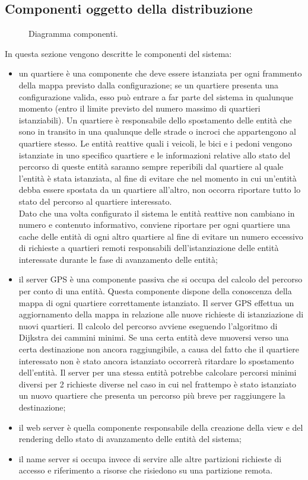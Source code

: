 \subsection{Componenti oggetto della distribuzione}\label{subsec:distribuzione}
\begin{figure}[H] %
\caption{Diagramma componenti.}
\label{fig:Diagramma componenti}
\end{figure}
In questa sezione vengono descritte le componenti del sistema:
\begin{itemize}
\item un quartiere è una componente che deve essere istanziata per ogni
frammento della mappa previsto dalla configurazione; se un quartiere presenta una configurazione valida, esso può entrare a far parte del sistema in qualunque momento (entro il limite previsto del numero massimo di quartieri istanziabili). Un quartiere è responsabile dello spostamento delle entità che sono in transito in una qualunque delle strade o incroci che appartengono al quartiere stesso. Le entità reattive quali i veicoli, le bici e i pedoni vengono istanziate in uno specifico quartiere e le informazioni relative allo stato del percorso di queste entità saranno sempre reperibili dal quartiere al quale l'entità è stata istanziata, al fine di evitare che nel momento in cui un'entità debba essere spostata da un quartiere all'altro, non occorra riportare tutto lo stato del percorso al quartiere interessato.\\
Dato che una volta configurato il sistema le entità reattive non cambiano in numero e contenuto informativo, conviene riportare per ogni quartiere una cache delle entità di ogni altro quartiere al fine di evitare un numero eccessivo di richieste a quartieri remoti responsabili dell'istanziazione delle entità interessate durante le fase di avanzamento delle entità;
\item il server GPS è una componente passiva che si occupa del calcolo del
percorso per conto di una entità. Questa componente dispone della conoscenza della mappa di ogni quartiere correttamente istanziato. Il server GPS effettua un aggiornamento della mappa in relazione alle nuove richieste di istanziazione di nuovi quartieri. Il calcolo del percorso avviene eseguendo l'algoritmo di Dijkstra dei cammini minimi. Se una certa entità deve muoversi verso una certa destinazione non ancora raggiungibile, a causa del fatto che il quartiere interessato non è stato ancora istanziato occorrerà ritardare lo spostamento dell'entità. Il server per una stessa entità potrebbe calcolare percorsi minimi diversi per 2 richieste diverse nel caso in cui nel frattempo è stato istanziato un nuovo quartiere che presenta un percorso più breve per raggiungere la destinazione;
\item il web server è quella componente responsabile della creazione della view e del rendering dello stato di avanzamento delle entità del sistema;
\item il name server si occupa invece di servire alle altre partizioni richieste di accesso e riferimento a risorse che risiedono su una partizione remota.
\end{itemize}